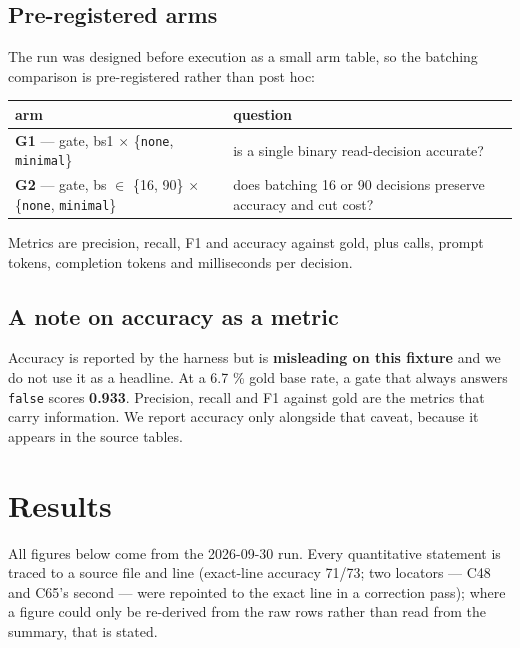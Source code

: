\documentclass[10pt]{article}
\begin{document}
\subsection{Pre-registered arms}

The run was designed before execution as a small arm table, so the batching comparison is pre-registered rather than post hoc:


\begin{center}
\begin{tabular}{@{}>{\raggedright\arraybackslash}p{}>{\raggedright\arraybackslash}p{}@{}}
\hline
\textbf{arm} & \textbf{question} \\ \hline
\textbf{G1} --- gate, bs1 $\times$ \{\texttt{none}, \texttt{minimal}\} & is a single binary read-decision accurate? \\ \hline
\textbf{G2} --- gate, bs $\in$ \{16, 90\} $\times$ \{\texttt{none}, \texttt{minimal}\} & does batching 16 or 90 decisions preserve accuracy and cut cost? \\ \hline
\end{tabular}
\end{center}

Metrics are precision, recall, F1 and accuracy against gold, plus calls, prompt tokens, completion tokens and milliseconds per decision.

\subsection{A note on accuracy as a metric}

Accuracy is reported by the harness but is \textbf{misleading on this fixture} and we do not use it as a headline. At a 6.7 \% gold base rate, a gate that always answers \texttt{false} scores \textbf{0.933}. Precision, recall and F1 against gold are the metrics that carry information. We report accuracy only alongside that caveat, because it appears in the source tables.

\section{Results}

All figures below come from the 2026-09-30 run. Every quantitative statement is traced to a source file and line (exact-line accuracy 71/73; two locators --- C48 and C65's second --- were repointed to the exact line in a correction pass); where a figure could only be re-derived from the raw rows rather than read from the summary, that is stated.
\end{document}
